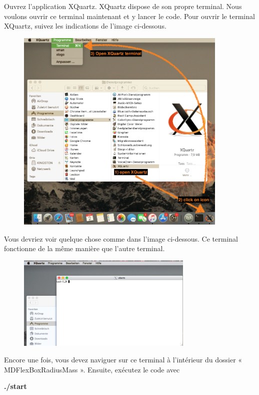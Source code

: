 \documentclass{article}
\begin{document}
Ouvrez l'application XQuartz. XQuartz dispose de son propre terminal. Nous voulons ouvrir ce terminal maintenant et y lancer le code. Pour ouvrir le terminal XQuartz, suivez les indications de l'image ci-dessous.
\begin{figure}[H]
\center
\includegraphics[width=0.9\textwidth]{Plots/TroubleshootingMD.png}
\end{figure}
Vous devriez voir quelque chose comme dans l'image ci-dessous. Ce terminal fonctionne de la même manière que l'autre terminal.
\begin{figure}[H]
\center
\includegraphics[width=0.75\textwidth]{Plots/XQuartzTerminal.png}
\end{figure}
Encore une fois, vous devez naviguer sur ce terminal à l'intérieur du dossier « MDFlexBoxRadiusMass ». Ensuite, exécutez le code avec
\begin{tcolorbox}[width=\textwidth,colframe=Bittersweet,colback={black},title={Ceci est le terminal},outer arc=0mm,colupper=white]  
    \large\textbf{  ./start }
\end{tcolorbox}
\end{document}
